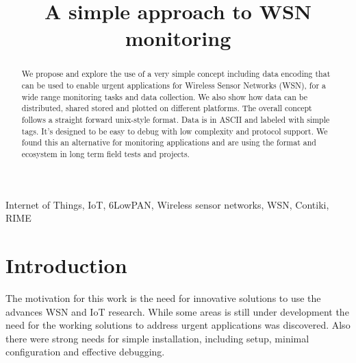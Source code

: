 \documentclass[conference, a4paper,10pt,twocolumn]{IEEEtran}
\begin{document}
\title{A simple approach to WSN monitoring}



\maketitle
\begin{abstract}

We propose and explore the use of a very simple concept including data encoding
that can be used to enable urgent applications for Wireless Sensor Networks (WSN), 
for a wide range monitoring tasks and data collection. We also show how data can 
be distributed, shared stored and plotted on different platforms. The overall 
concept follows a straight forward unix-style format. Data is in ASCII and labeled 
with simple tags. 
It's designed to be easy to debug with low complexity and protocol support. We found 
this an alternative for monitoring applications and are using the format and ecosystem 
in long term field tests and projects.


\end{abstract}

\begin{IEEEkeywords} 
Internet of Things, IoT, 6LowPAN, Wireless sensor networks, WSN, Contiki, RIME
 \end{IEEEkeywords}



%

\section{Introduction}
\label{sec:intro}
 

The motivation for this work is the need for innovative solutions to use the advances 
WSN and IoT research. While some areas is still under development the need for the
working solutions to address urgent applications was discovered. Also there were 
strong needs for simple installation, including setup, minimal configuration and 
effective debugging.
\end{document}
